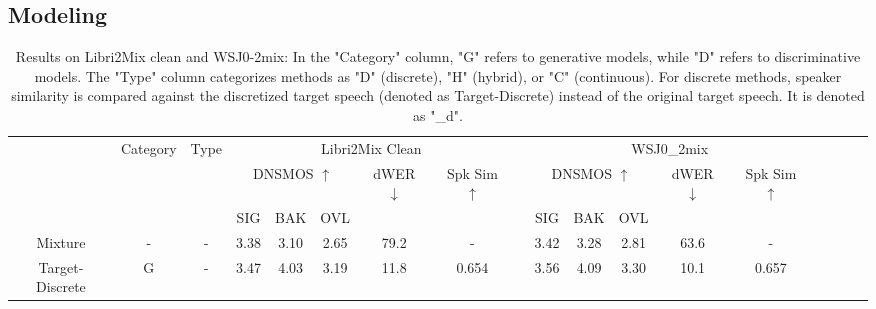 \documentclass[conference]{IEEEtran}
\begin{document}
\subsection{Modeling}

\begin{table}
  \caption{Results on Libri2Mix clean and WSJ0-2mix: In the "Category" column, "G" refers to generative models, while "D" refers to discriminative models. The "Type" column categorizes methods as "D" (discrete), "H" (hybrid), or "C" (continuous).
  For discrete methods, speaker similarity is compared against the discretized target speech (denoted as Target-Discrete) instead of the original target speech. It is denoted as "\_d".}
  \renewcommand{\arraystretch}{1.2}
  \begin{center}
    \setlength{\tabcolsep}{4.9pt}
  \begin{tabular}{cccccccccccccccccc}
    \Xhline{2\arrayrulewidth} %
  \multirow{3}{*}{System} & \multicolumn{1}{l}{\multirow{3}{*}{Category}} & \multicolumn{1}{l}{\multirow{3}{*}{Type}} &  \multicolumn{5}{c}{Libri2Mix Clean}                    &                               & \multicolumn{5}{c}{WSJ0\_2mix}                                                  \\
  \cline{4-8} \cline{10-14}
                          & \multicolumn{1}{l}{}                                                 & \multicolumn{1}{l}{}                            & \multicolumn{3}{c}{DNSMOS $\uparrow$} & dWER $\downarrow$ & Spk Sim $\uparrow$ &  & \multicolumn{3}{c}{DNSMOS $\uparrow$} & dWER $\downarrow$ & Spk Sim $\uparrow$  \\ \cline{4-6} \cline{10-12}
                          & \multicolumn{1}{l}{}                                                    & \multicolumn{1}{l}{}                            & SIG         & BAK        & OVL        &                   &        &             & SIG         & BAK        & OVL        &                   &                    \\ \hline
  Mixture                 & -                                             & -                                                                                           & 3.38        & 3.10       & 2.65       & 79.2            & -        &           & 3.42        & 3.28       & 2.81       & 63.6            & -                  \\
  Target-Discrete         & G                                             & -                                                                                          & 3.47       & 4.03       & 3.19       & 11.8            & 0.654     &          & 3.56        & 4.09       & 3.30       & 10.1            & 0.657               \\ \hline

\end{tabular}
\end{center}
\end{table}
\end{document}

